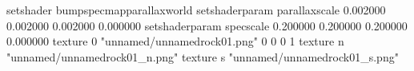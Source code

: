 setshader bumpspecmapparallaxworld
setshaderparam parallaxscale 0.002000 0.002000 0.002000 0.000000
setshaderparam specscale 0.200000 0.200000 0.200000 0.000000
texture 0 "unnamed/unnamedrock01.png" 0 0 0 1
texture n "unnamed/unnamedrock01_n.png"
texture s "unnamed/unnamedrock01_s.png"